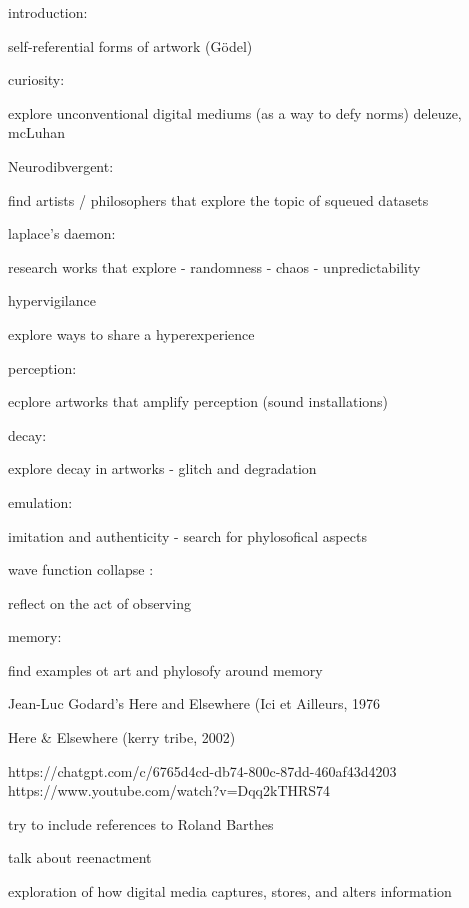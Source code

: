 


introduction:

self-referential forms of artwork
(Gödel)

curiosity:

explore unconventional digital mediums (as a way to defy norms)
deleuze, mcLuhan

Neurodibvergent:

find artists / philosophers that explore the topic of squeued datasets 


laplace's daemon:

research works that explore 
- randomness 
- chaos 
- unpredictability 



hypervigilance

explore ways to share a hyperexperience
 

perception:

ecplore artworks that amplify perception 
(sound installations)

decay:

explore decay in artworks 
 - glitch and degradation 


 emulation:

 imitation and authenticity -   search for phylosofical aspects 


 wave function collapse : 

 reflect on the act of observing


 memory: 

 find examples ot art and phylosofy around memory 

 Jean-Luc Godard’s Here and Elsewhere (Ici et Ailleurs, 1976

 Here & Elsewhere (kerry tribe, 2002)

 https://chatgpt.com/c/6765d4cd-db74-800c-87dd-460af43d4203
 https://www.youtube.com/watch?v=Dqq2kTHRS74


try to include references  to Roland Barthes

talk about reenactment 

exploration of how digital media captures, stores, and alters information